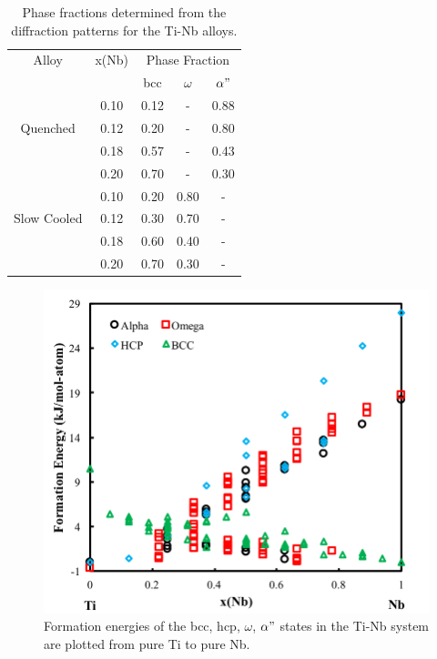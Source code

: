 \newpage
\begin{table}[H]
	\caption{Phase fractions determined from the diffraction patterns for the Ti-Nb alloys.}
	\centering
	\begin{tabular}{ c c c c c }
		\hline
		Alloy & x(Nb) & \multicolumn{3}{c}{Phase Fraction} \\
		&  & bcc & $\omega$ & $\alpha"$ \\
		\hline
		& 0.10 & 0.12 & - & 0.88 \\
		Quenched & 0.12 & 0.20 & - & 0.80 \\
		& 0.18 & 0.57 & - & 0.43 \\
		& 0.20 & 0.70 & - & 0.30 \\
		\hline
		& 0.10 & 0.20 & 0.80 & - \\
		Slow Cooled & 0.12 & 0.30 & 0.70 & - \\
		& 0.18 & 0.60 & 0.40 & - \\
		& 0.20 & 0.70 & 0.30 & - \\
		\hline
	\end{tabular}
	\label{Ch7-table:phasefrac}
\end{table}
\clearpage

\pagebreak
\begin{figure}[H]
	\centering
	\includegraphics[width=\textwidth]{Chapter-7/Figures/tinb0k.png}
	\caption{Formation energies of the bcc, hcp, $\omega$, $\alpha"$ states in the Ti-Nb system are plotted from pure Ti to pure Nb.}
	\label{Ch7-figure:tinb0K}
\end{figure}

